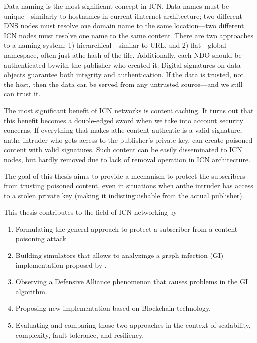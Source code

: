 Data naming is the most significant concept in ICN. Data names must be unique––similarly to hostnames in current iInternet architecture; two different DNS nodes must resolve one domain name to the same location––two different ICN nodes must resolve one name to the same content. 
There are two approaches to a naming system: 1) hierarchical - similar to URL, and 2) flat - global namespace, often just athe hash of the file.
Additionally, each NDO should be authenticated bywith the publisher who created it. Digital signatures on data objects guarantee both integrity and authentication. If the data is trusted, not the host, then the data can be served from any untrusted source––and we still can trust it.

The most significant benefit of ICN networks is content caching. It turns out that this benefit becomes a double-edged sword when we take into account security concerns. If everything that makes athe content authentic is a valid signature, anthe intruder who gets access to the publisher's private key, can create poisoned content with valid signatures. Such content can be easily disseminated to ICN nodes, but hardly removed due to lack of removal operation in ICN architecture. 

The goal of this thesis aimis to provide a mechanism to protect the subscribers from trusting poisoned content, even in situations when anthe intruder has access to a stolen private key (making it indistinguishable from the actual publisher).

This thesis contributes to the field of ICN networking by 
\begin{enumerate}
    \item Formulating the general approach to protect a subscriber from a content poisoning attack.
    \item Building simulators that allows to analyzinge a graph infection (GI) implementation proposed by \cite{konorski2019mitigating}. 
    \item Observing a Defensive Alliance phenomenon that causes problems in the GI algorithm.
    \item Proposing new implementation based on Blockchain technology.
    \item Evaluating and comparing those two approaches in the context of scalability, complexity, fault-tolerance, and resiliency. 
\end{enumerate}

